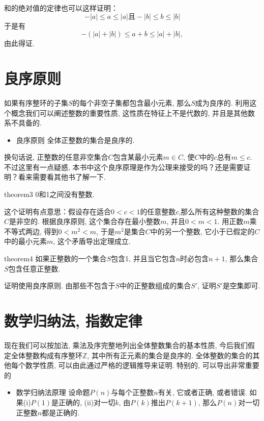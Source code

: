 和的绝对值的定律也可以这样证明：
\[
-|a| \le a \le |a| \text{且} -|b| \le b \le |b|
\]
于是有
\[
-(|a|+|b|) \le  a + b \le |a|+|b|,
\]
由此得证. 


\section{良序原则}\label{section0010104}
如果有序整环的子集$S$的每个非空子集都包含最小元素, 那么$S$成为良序的. 利用这个概念我们可以阐述整数的重要性质, 这性质在特征上不是代数的, 并且是其他数系不具备的. 
\begin{itemize}
\item 良序原则 全体正整数的集合是良序的. 
\end{itemize}

换句话说, 正整数的任意非空集合$C$包含某最小元素$m \in C$, 使$C$中的$c$总有$m \le c$. 不过这里有一点疑惑, 本书中这个良序原理是作为公理来接受的吗？还是需要证明？看来需要看其他书了解一下. 

\begin{theorem}{}{theorem3}
0和1之间没有整数. 
\end{theorem}

这个证明有点意思：假设存在适合$0<c<1$的任意整数$c$,那么所有这种整数的集合$C$是非空的. 根据良序原则, 这个集合存在最小整数$m$, 并且$0 < m < 1$. 用正数$m$乘不等式两边, 得到$0 < m^2 < m$, 于是$m^2$是集合$C$中的另一个整数, 它小于已假定的$C$中的最小元素$m$, 这个矛盾导出定理成立. 

\begin{theorem}{}{theorem4}
如果正整数的一个集合$S$包含1, 并且当它包含$n$时必包含$n+1$, 那么集合$S$包含任意正整数. 
\end{theorem}

证明使用良序原则. 由那些不包含于$S$中的正整数组成的集合$S'$, 证明$S'$是空集即可. 

\section{数学归纳法, 指数定律}
现在我们可以按加法, 乘法及序完整地列出全体整数集合的基本性质, 今后我们假定全体整数构成有序整环$\mathbb{Z}$, 其中所有正元素的集合是良序的. 全体整数的集合的其他每个数学性质, 可以由此通过严格的逻辑推导来证明. 特别的, 可以导出非常重要的
\begin{itemize}
\item \textcolor{main}{数学归纳法原理} 设命题$P(n)$与每个正整数$n$有关, 它或者正确, 或者错误. 如果(i)$P(1)$是正确的, (ii)对一切$k$, 由$P(k)$推出$P(k+1)$, 那么$P(n)$对一切正整数$n$都是正确的. 
\end{itemize}

